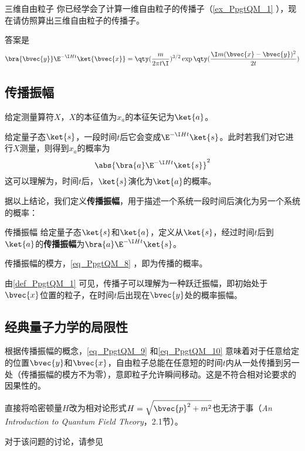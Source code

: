 \begin{exercise}{三维自由粒子}
你已经学会了计算一维自由粒子的传播子（\autoref{ex_PpgtQM_1} ），现在请仿照算出三维自由粒子的传播子。

答案是
\begin{equation}\label{eq_PpgtQM_10}
\bra{\bvec{y}}\E^{-\I H t}\ket{\bvec{x}} = \qty(\frac{m}{2\pi t\I})^{3/2}\exp\qty(\frac{\I m(\bvec{x}-\bvec{y})^2}{2t})
\end{equation}
\end{exercise}









\subsection{传播振幅}


给定测量算符$X$，$X$的本征值为$x_a$的本征矢记为$\ket{a}$。

给定量子态$\ket{s}$，一段时间$t$后它会变成$\E^{-\I Ht}\ket{s}$。此时若我们对它进行$X$测量，则得到$x_a$的概率为
\begin{equation}\label{eq_PpgtQM_8}
\abs{\bra{a}\E^{-\I Ht}\ket{s}}^2
\end{equation}
这可以理解为，时间$t$后，$\ket{s}$演化为$\ket{a}$的概率。

据以上结论，我们定义\textbf{传播振幅}，用于描述一个系统一段时间后演化为另一个系统的概率：

\begin{definition}{传播振幅}\label{def_PpgtQM_1}
给定量子态$\ket{s}$和$\ket{a}$，定义从$\ket{s}$，经过时间$t$后到$\ket{a}$的\textbf{传播振幅}为$\bra{a}\E^{-\I Ht}\ket{s}$。

传播振幅的模方，\autoref{eq_PpgtQM_8} ，即为传播的概率。
\end{definition}

由\autoref{def_PpgtQM_1} 可见，传播子可以理解为一种跃迁振幅，即初始处于$\bvec{x}$位置的粒子，在时间$t$后出现在$\bvec{y}$处的概率振幅。




\subsection{经典量子力学的局限性}

根据传播振幅的概念，\autoref{eq_PpgtQM_9} 和\autoref{eq_PpgtQM_10} 意味着对于任意给定的位置$\bvec{y}$和$\bvec{x}$，自由粒子总能在任意短的时间$t$内从一处传播到另一处（传播振幅的模方不为零），意即粒子允许瞬间移动。这是不符合相对论要求的因果性的。

直接将哈密顿量$H$改为相对论形式$H=\sqrt{\bvec{p}^2+m^2}$也无济于事（\textsl{An Introduction to Quantum Field Theory}\cite{Peskin}，2.1节）。

对于该问题的讨论，请参见














